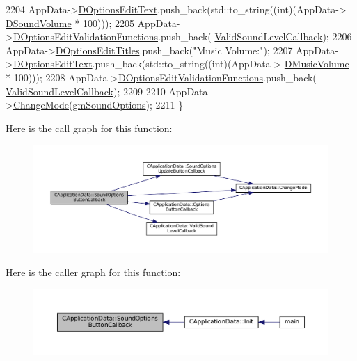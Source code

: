 \begin{DoxyCode}
2204     AppData->\hyperlink{classCApplicationData_a7044dc34cbd9d6776e8ef79eb12b5ce4}{DOptionsEditText}.push\_back(std::to\_string((\textcolor{keywordtype}{int})(AppData->
      \hyperlink{classCApplicationData_aa6e540f860dcb1929ef36ddce3be3691}{DSoundVolume} * 100)));
2205     AppData->\hyperlink{classCApplicationData_ab76fa444142de66fdb058f390e01112c}{DOptionsEditValidationFunctions}.push\_back(
      \hyperlink{classCApplicationData_ae3216a4fccd68c9657d7e936b1a6df67}{ValidSoundLevelCallback});
2206     AppData->\hyperlink{classCApplicationData_a7a322ef6b8c1db3e995c6b493230fd05}{DOptionsEditTitles}.push\_back(\textcolor{stringliteral}{"Music Volume:"});
2207     AppData->\hyperlink{classCApplicationData_a7044dc34cbd9d6776e8ef79eb12b5ce4}{DOptionsEditText}.push\_back(std::to\_string((\textcolor{keywordtype}{int})(AppData->
      \hyperlink{classCApplicationData_a8bc61af4a83a667102e55cca2a739c3b}{DMusicVolume} * 100)));
2208     AppData->\hyperlink{classCApplicationData_ab76fa444142de66fdb058f390e01112c}{DOptionsEditValidationFunctions}.push\_back(
      \hyperlink{classCApplicationData_ae3216a4fccd68c9657d7e936b1a6df67}{ValidSoundLevelCallback});
2209     
2210     AppData->\hyperlink{classCApplicationData_aee18c113e9a0acb3cad3d63eb19de71b}{ChangeMode}(\hyperlink{classCApplicationData_ac8ac37a4c8bb871036fbbdc6a072e403a3b63571023293bc10198d9128b5b8a16}{gmSoundOptions});
2211 \}
\end{DoxyCode}
Here is the call graph for this function\+:
\nopagebreak
\begin{figure}[H]
\begin{center}
\leavevmode
\includegraphics[width=350pt]{classCApplicationData_a7169395ea835eaa9c98188d1b3583534_cgraph}
\end{center}
\end{figure}
Here is the caller graph for this function\+:
\nopagebreak
\begin{figure}[H]
\begin{center}
\leavevmode
\includegraphics[width=350pt]{classCApplicationData_a7169395ea835eaa9c98188d1b3583534_icgraph}
\end{center}
\end{figure}
